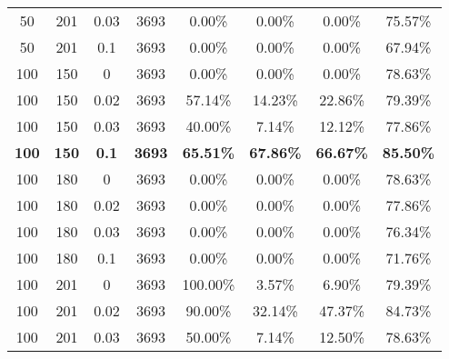\begin{table}[h]
{\begin{tabular}{cccccccc}
50                   & 201         & 0.03          & 3693         & 0.00\%             & 0.00\%          & 0.00\%      & 75.57\%           \\
50                   & 201         & 0.1           & 3693         & 0.00\%             & 0.00\%          & 0.00\%      & 67.94\%           \\
100                  & 150         & 0             & 3693         & 0.00\%             & 0.00\%          & 0.00\%      & 78.63\%           \\
100                  & 150         & 0.02          & 3693         & 57.14\%            & 14.23\%         & 22.86\%     & 79.39\%           \\
100                  & 150         & 0.03          & 3693         & 40.00\%            & 7.14\%          & 12.12\%     & 77.86\%           \\
\textcolor{customDarkRed}{\textbf{100}}                  & \textcolor{customDarkRed}{\textbf{150}}         & \textcolor{customDarkRed}{\textbf{0.1}  }        & \textcolor{customDarkRed}{\textbf{3693}}         & \textcolor{customDarkRed}{\textbf{65.51\%}}            & \textcolor{customDarkRed}{\textbf{67.86\%}}         & \textcolor{customDarkRed}{\textbf{66.67\%}}    & \textcolor{customDarkRed}{\textbf{85.50\%}}           \\
100                  & 180         & 0             & 3693         & 0.00\%             & 0.00\%          & 0.00\%      & 78.63\%           \\
100                  & 180         & 0.02          & 3693         & 0.00\%             & 0.00\%          & 0.00\%      & 77.86\%           \\
100                  & 180         & 0.03          & 3693         & 0.00\%             & 0.00\%          & 0.00\%      & 76.34\%           \\
100                  & 180         & 0.1           & 3693         & 0.00\%             & 0.00\%          & 0.00\%      & 71.76\%           \\
100                  & 201         & 0             & 3693         & 100.00\%           & 3.57\%          & 6.90\%      & 79.39\%           \\
100                  & 201         & 0.02          & 3693         & 90.00\%            & 32.14\%         & 47.37\%     & 84.73\%           \\
100                  & 201         & 0.03          & 3693         & 50.00\%            & 7.14\%          & 12.50\%     & 78.63\%           \\

\end{tabular}}
\end{table}
